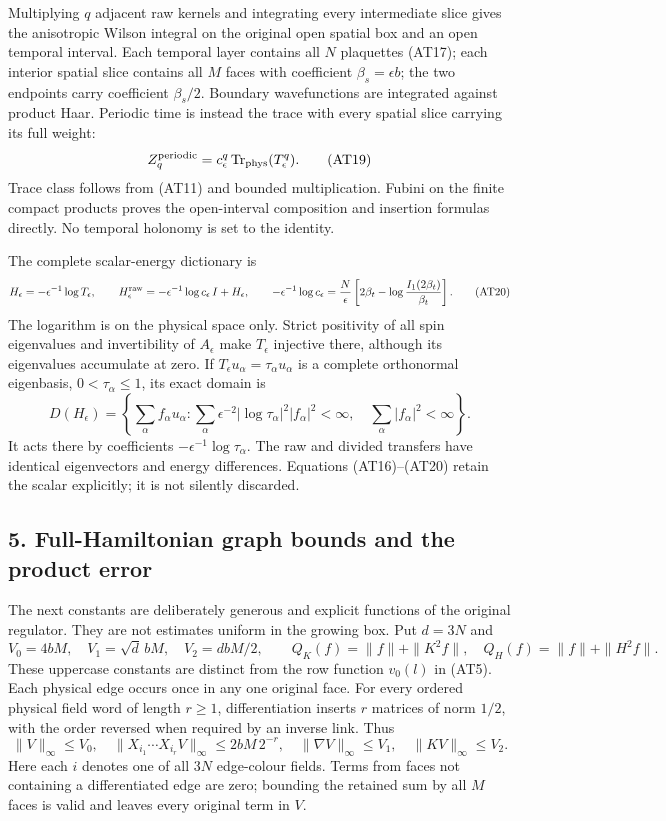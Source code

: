 \documentclass[11pt]{article}
\begin{document}
Multiplying \(q\) adjacent raw kernels and integrating every intermediate slice gives the anisotropic Wilson integral on the original open spatial box and an open temporal interval. Each temporal layer contains all \(N\) plaquettes (AT17); each interior spatial slice contains all \(M\) faces with coefficient \(\beta_s=\epsilon b\); the two endpoints carry coefficient \(\beta_s/2\). Boundary wavefunctions are integrated against product Haar. Periodic time is instead the trace with every spatial slice carrying its full weight:
\[
 Z_q^{\rm periodic}
   =c_\epsilon^q\operatorname{Tr}_{\rm phys}(T_\epsilon^q).
 \tag{AT19}
\]
Trace class follows from (AT11) and bounded multiplication. Fubini on the finite compact products proves the open-interval composition and insertion formulas directly. No temporal holonomy is set to the identity.

The complete scalar-energy dictionary is
\[
 H_\epsilon=-\epsilon^{-1}\log T_\epsilon,\qquad
 H_\epsilon^{\rm raw}
   =-\epsilon^{-1}\log c_\epsilon\,I+H_\epsilon,\qquad
 -\epsilon^{-1}\log c_\epsilon
   =\frac N\epsilon\left[2\beta_t-\log\frac{I_1(2\beta_t)}{\beta_t}\right].
 \tag{AT20}
\]
The logarithm is on the physical space only. Strict positivity of all spin eigenvalues and invertibility of \(A_\epsilon\) make \(T_\epsilon\) injective there, although its eigenvalues accumulate at zero. If \(T_\epsilon u_\alpha=\tau_\alpha u_\alpha\) is a complete orthonormal eigenbasis, \(0<\tau_\alpha\le1\), its exact domain is
\[
 D(H_\epsilon)=
 \left\{\sum_\alpha f_\alpha u_\alpha:
   \sum_\alpha \epsilon^{-2}|\log\tau_\alpha|^2|f_\alpha|^2<\infty,
   \quad \sum_\alpha|f_\alpha|^2<\infty\right\}.
\]
It acts there by coefficients \(-\epsilon^{-1}\log\tau_\alpha\).
The raw and divided transfers have identical eigenvectors and energy differences. Equations (AT16)–(AT20) retain the scalar explicitly; it is not silently discarded.

\subsection*{5. Full-Hamiltonian graph bounds and the product error}

The next constants are deliberately generous and explicit functions of the original regulator. They are not estimates uniform in the growing box. Put \(d=3N\) and
\[
 V_0=4bM,\quad V_1=\sqrt d\,bM,\quad V_2=dbM/2,\qquad
 Q_K(f)=\|f\|+\|K^2f\|,\quad Q_H(f)=\|f\|+\|H^2f\|.
 \tag{AT21}
\]
These uppercase constants are distinct from the row function \(v_0(l)\) in (AT5).
Each physical edge occurs once in any one original face. For every ordered physical field word of length \(r\ge1\), differentiation inserts \(r\) matrices of norm \(1/2\), with the order reversed when required by an inverse link. Thus
\[
 \|V\|_\infty\le V_0,\quad
 \|X_{i_1}\cdots X_{i_r}V\|_\infty\le2bM\,2^{-r},
 \quad \|\nabla V\|_\infty\le V_1,\quad
 \|KV\|_\infty\le V_2 .
 \tag{AT22}
\]
Here each \(i\) denotes one of all \(3N\) edge-colour fields. Terms from faces not containing a differentiated edge are zero; bounding the retained sum by all \(M\) faces is valid and leaves every original term in \(V\).
\end{document}
